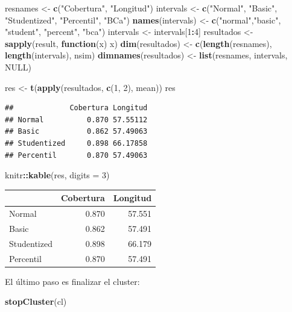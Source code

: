 \documentclass[
]{book}
\newenvironment{Shaded}{\begin{snugshade}}{\end{snugshade}}
\newcommand{\AttributeTok}[1]{\textcolor[rgb]{0.13,0.29,0.53}{#1}}
\newcommand{\ConstantTok}[1]{\textcolor[rgb]{0.56,0.35,0.01}{#1}}
\newcommand{\ControlFlowTok}[1]{\textcolor[rgb]{0.13,0.29,0.53}{\textbf{#1}}}
\newcommand{\DecValTok}[1]{\textcolor[rgb]{0.00,0.00,0.81}{#1}}
\newcommand{\FunctionTok}[1]{\textcolor[rgb]{0.13,0.29,0.53}{\textbf{#1}}}
\newcommand{\NormalTok}[1]{#1}
\newcommand{\OtherTok}[1]{\textcolor[rgb]{0.56,0.35,0.01}{#1}}
\newcommand{\SpecialCharTok}[1]{\textcolor[rgb]{0.81,0.36,0.00}{\textbf{#1}}}
\newcommand{\StringTok}[1]{\textcolor[rgb]{0.31,0.60,0.02}{#1}}
\theoremstyle{break}
\theoremstyle{nonumberplain}
\begin{document}
\begin{Shaded}
\begin{Highlighting}[]
\NormalTok{resnames }\OtherTok{\textless{}{-}} \FunctionTok{c}\NormalTok{(}\StringTok{"Cobertura"}\NormalTok{, }\StringTok{"Longitud"}\NormalTok{)}
\NormalTok{intervals }\OtherTok{\textless{}{-}} \FunctionTok{c}\NormalTok{(}\StringTok{"Normal"}\NormalTok{, }\StringTok{"Basic"}\NormalTok{, }\StringTok{"Studentized"}\NormalTok{, }\StringTok{"Percentil"}\NormalTok{, }\StringTok{"BCa"}\NormalTok{)}
\FunctionTok{names}\NormalTok{(intervals) }\OtherTok{\textless{}{-}} \FunctionTok{c}\NormalTok{(}\StringTok{"normal"}\NormalTok{,}\StringTok{"basic"}\NormalTok{, }\StringTok{"student"}\NormalTok{, }\StringTok{"percent"}\NormalTok{, }\StringTok{"bca"}\NormalTok{)}
\NormalTok{intervals }\OtherTok{\textless{}{-}}\NormalTok{ intervals[}\DecValTok{1}\SpecialCharTok{:}\DecValTok{4}\NormalTok{]}
\NormalTok{resultados }\OtherTok{\textless{}{-}} \FunctionTok{sapply}\NormalTok{(result, }\ControlFlowTok{function}\NormalTok{(x) x)}
\FunctionTok{dim}\NormalTok{(resultados) }\OtherTok{\textless{}{-}} \FunctionTok{c}\NormalTok{(}\FunctionTok{length}\NormalTok{(resnames), }\FunctionTok{length}\NormalTok{(intervals), nsim)}
\FunctionTok{dimnames}\NormalTok{(resultados) }\OtherTok{\textless{}{-}} \FunctionTok{list}\NormalTok{(resnames, intervals, }\ConstantTok{NULL}\NormalTok{)}

\NormalTok{res }\OtherTok{\textless{}{-}} \FunctionTok{t}\NormalTok{(}\FunctionTok{apply}\NormalTok{(resultados, }\FunctionTok{c}\NormalTok{(}\DecValTok{1}\NormalTok{, }\DecValTok{2}\NormalTok{), mean))}
\NormalTok{res}
\end{Highlighting}
\end{Shaded}

\begin{verbatim}
##             Cobertura Longitud
## Normal          0.870 57.55112
## Basic           0.862 57.49063
## Studentized     0.898 66.17858
## Percentil       0.870 57.49063
\end{verbatim}

\begin{Shaded}
\begin{Highlighting}[]
\NormalTok{knitr}\SpecialCharTok{::}\FunctionTok{kable}\NormalTok{(res, }\AttributeTok{digits =} \DecValTok{3}\NormalTok{)}
\end{Highlighting}
\end{Shaded}

\begin{tabular}{l|r|r}
\hline
  & Cobertura & Longitud\\
\hline
Normal & 0.870 & 57.551\\
\hline
Basic & 0.862 & 57.491\\
\hline
Studentized & 0.898 & 66.179\\
\hline
Percentil & 0.870 & 57.491\\
\hline
\end{tabular}

El último paso es finalizar el cluster:

\begin{Shaded}
\begin{Highlighting}[]
\FunctionTok{stopCluster}\NormalTok{(cl)}
\end{Highlighting}
\end{Shaded}



\end{document}
